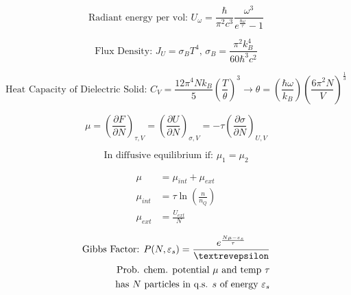\documentclass[12pt]{article}
\begin{document}
\vspace{-30pt}

\begin{multicols}{2}

  \begin{equation*}
    \text{Radiant energy per vol: }U_\omega=\frac{\hbar}{\pi^2c^3}\frac{\omega^3}{e^{\frac{\hbar\omega}{\tau}}-1}
  \end{equation*}

  \begin{equation*}
    \text{Flux Density: }J_U=\sigma_BT^4,\,\sigma_B=\frac{\pi^2k_B^4}{60\hbar^3c^2}
  \end{equation*}

\end{multicols}

\vspace{-20pt}

$$\text{Heat Capacity of Dielectric Solid: } C_V=\frac{12\pi^4Nk_B}{5}\left( \frac{T}{\theta} \right)^3\rightarrow\theta=\left( \frac{\hbar\omega}{k_B} \right)\left( \frac{6\pi^2N}{V} \right)^{\frac{1}{3}}$$

\begin{multicols}{2}

  \begin{equation*}
    \mu=\left( \frac{\partial F}{\partial N} \right)_{\tau,V}=\left( \frac{\partial U}{\partial N} \right)_{\sigma,V}=-\tau\left( \frac{\partial\sigma}{\partial N} \right)_{U,V}
  \end{equation*}

  \begin{equation*}
    \text{In diffusive equilibrium if: }\mu_1=\mu_2
  \end{equation*}

\end{multicols}

\begin{multicols}{2}

  \begin{equation*}
    \begin{split}
    \mu&=\mu_{int}+\mu_{ext}\\
    \mu_{int}&=\tau\ln\left( \frac{n}{n_Q} \right)\\
    \mu_{ext}&=\frac{U_{ext}}{N}
    \end{split}
  \end{equation*}

  \begin{equation*}
    \begin{split}
      \text{Gibbs Factor: }P(N,\varepsilon_s)=\frac{e^{\frac{N\mu-\varepsilon_s}{\tau}}}{\text{\textrevepsilon}}\\
      \text{Prob. chem. potential $\mu$ and temp $\tau$}\\
      \text{has $N$ particles in q.s. $s$ of energy $\varepsilon_s$}
    \end{split}
  \end{equation*}

\end{multicols}
\end{document}
